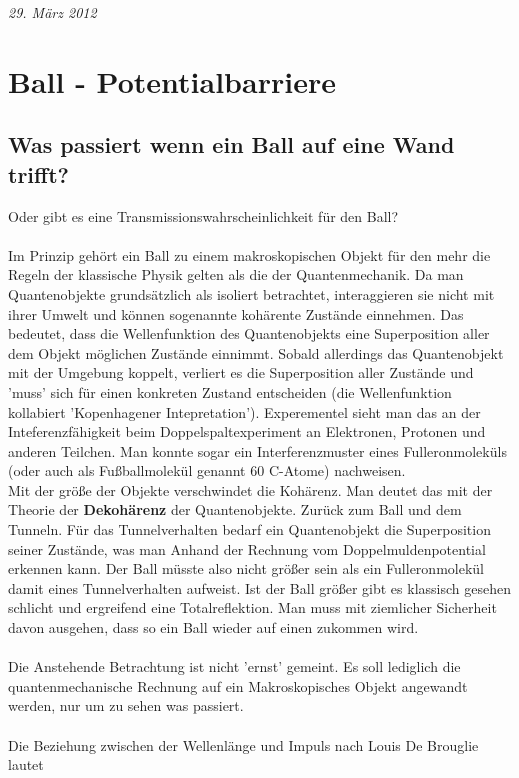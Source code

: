 



\textit{29. März 2012}


\section*{Ball - Potentialbarriere}

\subsection*{Was passiert wenn ein Ball auf eine Wand trifft?}

Oder gibt es eine Transmissionswahrscheinlichkeit für den Ball?\\
\\
Im Prinzip gehört ein Ball zu einem makroskopischen Objekt für den mehr die Regeln der klassische Physik gelten als die der Quantenmechanik. Da man Quantenobjekte grundsätzlich als isoliert betrachtet, interaggieren sie nicht mit ihrer Umwelt und können sogenannte kohärente Zustände einnehmen. Das bedeutet, dass die Wellenfunktion des Quantenobjekts eine Superposition aller dem Objekt möglichen Zustände einnimmt. Sobald allerdings das Quantenobjekt mit der Umgebung koppelt, verliert es die Superposition aller Zustände und 'muss' sich für einen konkreten Zustand entscheiden (die Wellenfunktion kollabiert 'Kopenhagener Intepretation'). Experementel sieht man das an der Inteferenzfähigkeit beim Doppelspaltexperiment an Elektronen, Protonen und anderen Teilchen. Man konnte sogar ein Interferenzmuster eines Fulleronmoleküls (oder auch als Fußballmolekül genannt 60 C-Atome) nachweisen.\\

Mit der größe der Objekte verschwindet die Kohärenz. Man deutet das mit der Theorie der \textbf{Dekohärenz} der Quantenobjekte. Zurück zum Ball und dem Tunneln. Für das Tunnelverhalten bedarf ein Quantenobjekt die Superposition seiner Zustände, was man Anhand der Rechnung vom Doppelmuldenpotential erkennen kann. Der Ball müsste also nicht größer sein als ein Fulleronmolekül damit eines Tunnelverhalten aufweist. Ist der Ball größer gibt es klassisch gesehen schlicht und ergreifend eine Totalreflektion. Man muss mit ziemlicher Sicherheit davon ausgehen, dass so ein Ball wieder auf einen zukommen wird.\\
\\
Die Anstehende Betrachtung ist nicht 'ernst' gemeint. Es soll lediglich die quantenmechanische Rechnung auf ein Makroskopisches Objekt angewandt werden, nur um zu sehen was passiert.\\
\\
Die Beziehung zwischen der Wellenlänge und Impuls nach Louis De Brouglie lautet

